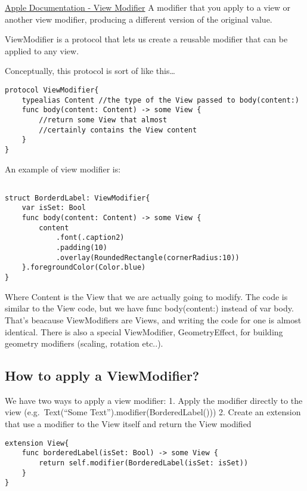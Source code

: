 \documentclass[]{article}
\begin{document}
\href{https://developer.apple.com/documentation/swiftui/viewmodifier}{Apple
Documentation - View Modifier} A modifier that you apply to a view or
another view modifier, producing a different version of the original
value.

ViewModifier is a protocol that lets us create a reusable modifier that
can be applied to any view.

Conceptually, this protocol is sort of like this\ldots{}

\begin{verbatim}
protocol ViewModifier{
    typealias Content //the type of the View passed to body(content:)
    func body(content: Content) -> some View {
        //return some View that almost 
        //certainly contains the View content
    }
}
\end{verbatim}

An example of view modifier is:

\begin{verbatim}

struct BorderdLabel: ViewModifier{
    var isSet: Bool
    func body(content: Content) -> some View {
        content
            .font(.caption2)
            .padding(10)
            .overlay(RoundedRectangle(cornerRadius:10))
    }.foregroundColor(Color.blue)
}
\end{verbatim}

Where Content is the View that we are actually going to modify. The code
is similar to the View code, but we have func body(content:) instead of
var body. That's beacause ViewModifiers are Views, and writing the code
for one is almost identical. There is also a special ViewModifier,
GeometryEffect, for building geometry modifiers (scaling, rotation
etc..).

\hypertarget{how-to-apply-a-viewmodifier}{%
\subsection{How to apply a
ViewModifier?}\label{how-to-apply-a-viewmodifier}}

We have two ways to apply a view modifier: 1. Apply the modifier
directly to the view (e.g.~Text(``Some
Text'').modifier(BorderedLabel())) 2. Create an extension that use a
modifier to the View itself and return the View modified

\begin{verbatim}
extension View{
    func borderedLabel(isSet: Bool) -> some View {
        return self.modifier(BorderedLabel(isSet: isSet))
    }
}
\end{verbatim}
\end{document}
